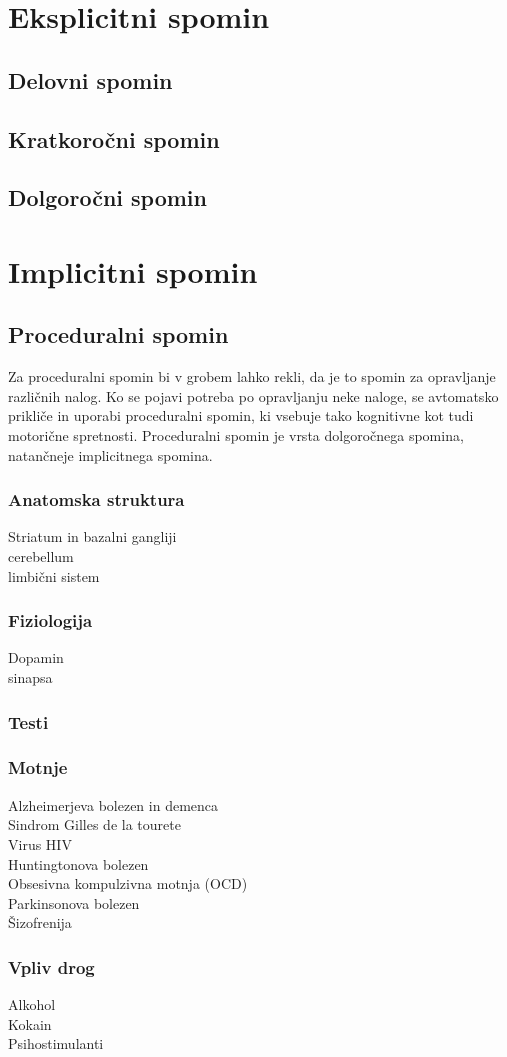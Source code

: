 \documentclass[10pt,a4paper]{article}
\begin{document}
\section{Eksplicitni spomin}
\subsection{Delovni spomin}

\subsection{Kratkoročni spomin}

\subsection{Dolgoročni spomin}

\section{Implicitni spomin}
\subsection{Proceduralni spomin}
Za proceduralni spomin bi v grobem lahko rekli, da je to spomin za opravljanje različnih nalog. Ko se pojavi potreba po opravljanju neke naloge, se avtomatsko prikliče in uporabi proceduralni spomin, ki vsebuje tako kognitivne kot tudi motorične spretnosti. Proceduralni spomin je vrsta dolgoročnega spomina, natančneje implicitnega spomina.

\subsubsection{Anatomska struktura}
Striatum in bazalni gangliji\\
cerebellum\\
limbični sistem

\subsubsection{Fiziologija}
Dopamin\\
sinapsa

\subsubsection{Testi}

\subsubsection{Motnje}
Alzheimerjeva bolezen in demenca\\
Sindrom Gilles de la tourete\\
Virus HIV\\
Huntingtonova bolezen\\
Obsesivna kompulzivna motnja (OCD)\\
Parkinsonova bolezen\\
Šizofrenija

\subsubsection{Vpliv drog}
Alkohol\\
Kokain\\
Psihostimulanti

\section{}
\end{document}
